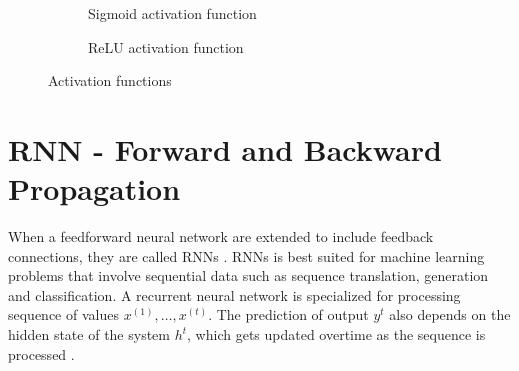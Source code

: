\begin{figure}[htbp]
    \centering
    \begin{subfigure}{0.45\textwidth}
        \caption{Sigmoid activation function}
        \label{fig:SigmoidActivation}
    \end{subfigure}
    \hspace{0.05\textwidth}
    \begin{subfigure}{0.45\textwidth}
        \caption{ReLU activation function}
        \label{fig:ReLUActivation}
    \end{subfigure}
   
    \caption{Activation functions}
    \label{fig:ActivationFunctions}
\end{figure}

\section{ \acs*{RNN} - Forward and Backward Propagation} \label{sec:math-rnn}

When a feedforward neural network are extended to include feedback connections, they are called \acfp{RNN} \parencite[Chapter 6, Page 164]{Goodfellow-et-al-2016}. \acfp{RNN} is best suited for machine learning problems that involve sequential data such as sequence translation, generation and classification. A recurrent neural network is specialized for processing sequence of values $ x^{(1)},\ldots,x^{(t)}$. The prediction of output $y^t$ also depends on the hidden state of the system $h^t$, which gets updated overtime as the sequence is processed \parencite[Chapter 15, Page 501]{pml1Book}.

